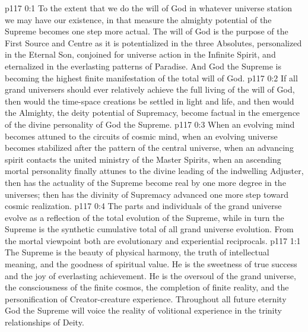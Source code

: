 \author{Mighty Messenger}
\vs p117 0:1 To the extent that we do the will of God in whatever universe station we may have our existence, in that measure the almighty potential of the Supreme becomes one step more actual. The will of God is the purpose of the First Source and Centre as it is potentialized in the three Absolutes, personalized in the Eternal Son, conjoined for universe action in the Infinite Spirit, and eternalized in the everlasting patterns of Paradise. And God the Supreme is becoming the highest finite manifestation of the total will of God.
\vs p117 0:2 If all grand universers should ever relatively achieve the full living of the will of God, then would the time\hyp{}space creations be settled in light and life, and then would the Almighty, the deity potential of Supremacy, become factual in the emergence of the divine personality of God the Supreme.
\vs p117 0:3 When an evolving mind becomes attuned to the circuits of cosmic mind, when an evolving universe becomes stabilized after the pattern of the central universe, when an advancing spirit contacts the united ministry of the Master Spirits, when an ascending mortal personality finally attunes to the divine leading of the indwelling Adjuster, then has the actuality of the Supreme become real by one more degree in the universes; then has the divinity of Supremacy advanced one more step toward cosmic realization.
\vs p117 0:4 The parts and individuals of the grand universe evolve as a reflection of the total evolution of the Supreme, while in turn the Supreme is the synthetic cumulative total of all grand universe evolution. From the mortal viewpoint both are evolutionary and experiential reciprocals.
\vs p117 1:1 The Supreme is the beauty of physical harmony, the truth of intellectual meaning, and the goodness of spiritual value. He is the sweetness of true success and the joy of everlasting achievement. He is the oversoul of the grand universe, the consciousness of the finite cosmos, the completion of finite reality, and the personification of Creator\hyp{}creature experience. Throughout all future eternity God the Supreme will voice the reality of volitional experience in the trinity relationships of Deity.

